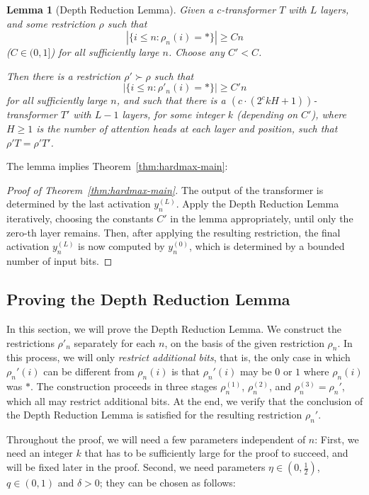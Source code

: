 \documentclass[11pt,letterpaper]{article}
\newcounter{theorem}
\newtheorem{lemma}[theorem]{Lemma}
\begin{document}
\begin{lemma}[Depth Reduction Lemma]\label{lemma:depth-red}
Given a $c$-transformer $T$ with $L$ layers, and some restriction $\rho$ such that
\begin{equation}
|\{i \leq n: \rho_n(i) = *\}| \geq Cn
\end{equation}
($C \in (0,1]$)
for all sufficiently large $n$.
Choose any $C' < C$.

Then there is a restriction $\rho' \succ \rho$ 
such that
\begin{equation}
|\{i \leq n: \rho'_n(i) = *\}| \geq C'n
\end{equation}
for all sufficiently large $n$, 
and such that there is a $( c\cdot(2^ckH+1))$-transformer $T'$ with $L-1$ layers, for some integer $k$ (depending on $C'$), where $H \geq 1$ is the number of attention heads at each layer and position, such that $\rho'T = \rho' T'$.
\end{lemma}
The lemma implies Theorem~\ref{thm:hardmax-main}:
\begin{proof}[Proof of Theorem~\ref{thm:hardmax-main}]
The output of the transformer is determined by the last activation $y_{n}^{(L)}$.
Apply the Depth Reduction Lemma iteratively, choosing the constants $C'$ in the lemma appropriately, until only the zero-th layer remains.
Then, after applying the resulting restriction, the final activation $y_{n}^{(L)}$ is now computed by $y_{n}^{(0)}$, which is determined by a bounded number of input bits.
\end{proof}



\subsection{Proving the Depth Reduction Lemma}
In this section, we will prove the Depth Reduction Lemma.
We construct the restrictions $\rho'_n$ separately for each $n$, on the basis of the given restriction $\rho_n$.
In this process, we will only \emph{restrict additional bits}, that is, the only case in which $\rho_n'(i)$ can be different from $\rho_n(i)$ is that $\rho_n'(i)$ may be $0$ or $1$ where $\rho_n(i)$ was $*$.
The construction proceeds in three stages $\rho_n^{(1)}$, $\rho_n^{(2)}$, and $\rho_n^{(3)} = \rho_n'$, which all may restrict additional bits.
At the end, we verify that the conclusion of the Depth Reduction Lemma is satisfied for the resulting restriction $\rho_n'$.

Throughout the proof, we will need a few parameters independent of $n$: First, we need an integer $k$ that has to be sufficiently large for the proof to succeed, and will be fixed later in the proof.
Second, we need parameters $\eta \in (0, \frac{1}{2})$, $q \in (0,1)$ and $\delta > 0$; they can be chosen as follows:
\end{document}
